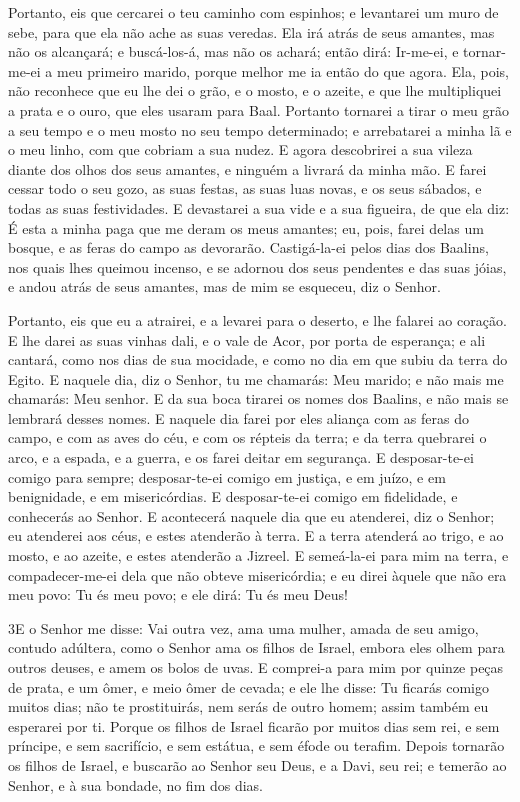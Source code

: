 Portanto, eis que cercarei o teu caminho com espinhos; e
levantarei um muro de sebe, para que ela não ache as suas veredas.
Ela irá atrás de seus amantes, mas não os alcançará; e
buscá-los-á, mas não os achará; então dirá: Ir-me-ei, e tornar-me-ei
a meu primeiro marido, porque melhor me ia então do que agora.
Ela, pois, não reconhece que eu lhe dei o grão, e o mosto, e o
azeite, e que lhe multipliquei a prata e o ouro, que eles usaram
para Baal. Portanto tornarei a tirar o meu grão a seu tempo e o
meu mosto no seu tempo determinado; e arrebatarei a minha lã e o meu
linho, com que cobriam a sua nudez. E agora descobrirei a sua
vileza diante dos olhos dos seus amantes, e ninguém a livrará da
minha mão. E farei cessar todo o seu gozo, as suas festas, as
suas luas novas, e os seus sábados, e todas as suas festividades.
E devastarei a sua vide e a sua figueira, de que ela diz: É
esta a minha paga que me deram os meus amantes; eu, pois, farei
delas um bosque, e as feras do campo as devorarão.
Castigá-la-ei pelos dias dos Baalins, nos quais lhes queimou
incenso, e se adornou dos seus pendentes e das suas jóias, e andou
atrás de seus amantes, mas de mim se esqueceu, diz o Senhor.

Portanto, eis que eu a atrairei, e a levarei para o deserto, e
lhe falarei ao coração. E lhe darei as suas vinhas dali, e o
vale de Acor, por porta de esperança; e ali cantará, como nos dias
de sua mocidade, e como no dia em que subiu da terra do Egito.
E naquele dia, diz o Senhor, tu me chamarás: Meu marido; e
não mais me chamarás: Meu senhor. E da sua boca tirarei os
nomes dos Baalins, e não mais se lembrará desses nomes. E
naquele dia farei por eles aliança com as feras do campo, e com as
aves do céu, e com os répteis da terra; e da terra quebrarei o arco,
e a espada, e a guerra, e os farei deitar em segurança. E
desposar-te-ei comigo para sempre; desposar-te-ei comigo em justiça,
e em juízo, e em benignidade, e em misericórdias. E
desposar-te-ei comigo em fidelidade, e conhecerás ao Senhor.
E acontecerá naquele dia que eu atenderei, diz o Senhor; eu
atenderei aos céus, e estes atenderão à terra. E a terra
atenderá ao trigo, e ao mosto, e ao azeite, e estes atenderão a
Jizreel. E semeá-la-ei para mim na terra, e compadecer-me-ei
dela que não obteve misericórdia; e eu direi àquele que não era meu
povo: Tu és meu povo; e ele dirá: Tu és meu Deus!

\medskip

\lettrine{3} E o Senhor me disse: Vai outra vez, ama uma
mulher, amada de seu amigo, contudo adúltera, como o Senhor ama os
filhos de Israel, embora eles olhem para outros deuses, e amem os
bolos de uvas. E comprei-a para mim por quinze peças de prata, e
um ômer, e meio ômer de cevada; e ele lhe disse: Tu ficarás
comigo muitos dias; não te prostituirás, nem serás de outro homem;
assim também eu esperarei por ti. Porque os filhos de Israel
ficarão por muitos dias sem rei, e sem príncipe, e sem sacrifício, e
sem estátua, e sem éfode ou terafim. Depois tornarão os filhos
de Israel, e buscarão ao Senhor seu Deus, e a Davi, seu rei; e
temerão ao Senhor, e à sua bondade, no fim dos dias.

